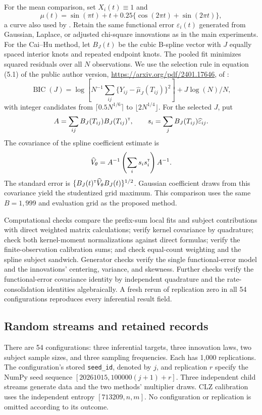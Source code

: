 For the mean comparison, set $X_i(t)\equiv1$ and
\[
\mu(t)=\sin(\pi t)+t+0.25\{\cos(2\pi t)+\sin(2\pi t)\},
\]
a curve also used by \citet{LouWu2026}. Retain the same functional error $\varepsilon_i(t)$ generated from Gaussian, Laplace, or adjusted chi-square innovations as in the main experiments. For the Cai--Hu method, let $B_J(t)$ be the cubic B-spline vector with $J$ equally spaced interior knots and repeated endpoint knots. The pooled fit minimizes squared residuals over all $N$ observations. We use the selection rule in equation (5.1) of the public author version, \url{https://arxiv.org/pdf/2401.17646}, of \citet{cai_hu_2025}:
\[
\operatorname{BIC}(J)=\log\left[N^{-1}\sum_{ij}
\{Y_{ij}-\widehat\mu_J(T_{ij})\}^2\right]+J\log(N)/N,
\]
with integer candidates from $\lceil0.5N^{1/6}\rceil$ to $\lfloor2N^{1/4}\rfloor$.
For the selected $J$, put
\[
A=\sum_{ij}B_J(T_{ij})B_J(T_{ij})^{\scriptscriptstyle\mathsf{T}},\qquad
s_i=\sum_j B_J(T_{ij})\widehat\varepsilon_{ij}.
\]
The covariance of the spline coefficient estimate is
\[
\widehat V_\theta=A^{-1}\left(\sum_i s_i s_i^{\scriptscriptstyle\mathsf{T}}\right)A^{-1}.
\]
The standard error is $\{B_J(t)^{\scriptscriptstyle\mathsf{T}}\widehat V_\theta B_J(t)\}^{1/2}$. Gaussian coefficient draws from this covariance yield the studentized grid maximum. This comparison uses the same $B=1{,}999$ and evaluation grid as the proposed method.

Computational checks compare the prefix-sum local fits and subject contributions with direct weighted matrix calculations; verify kernel covariance by quadrature; check both kernel-moment normalizations against direct formulas; verify the finite-observation calibration sums; and check equal-count weighting and the spline subject sandwich. Generator checks verify the single functional-error model and the innovations' centering, variance, and skewness. Further checks verify the functional-error covariance identity by independent quadrature and the rate-consolidation identities algebraically. A fresh rerun of replication zero in all 54 configurations reproduces every inferential result field.

\subsection{Random streams and retained records}

There are 54 configurations: three inferential targets, three innovation laws, two subject sample sizes, and three sampling frequencies. Each has 1,000 replications. The configuration's stored \texttt{seed\_id}, denoted by $j$, and replication $r$ specify the NumPy seed sequence $[20261015,100000(j+1)+r]$. Three independent child streams generate data and the two methods' multiplier draws. CLZ calibration uses the independent entropy $[713209,n,m]$. No configuration or replication is omitted according to its outcome.

